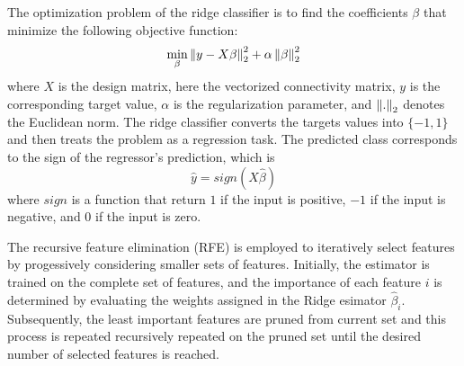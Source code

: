 The optimization problem of the ridge classifier is to find the coefficients $\beta$ that minimize the following objective function:
$$
\min_{\beta} \left\lVert y - X\beta\right\rVert_2^2 + \alpha \left\lVert\beta\right\rVert_2^2
$$
where $X$ is the design matrix, here the vectorized connectivity matrix, $y$ is the corresponding target value, $\alpha$ is the regularization parameter, and $\left\lVert.\right\rVert_2$ denotes the Euclidean norm. The ridge classifier converts the targets values into $\{-1, 1\}$ and then treats the problem as a regression task. The predicted class corresponds to the sign of the regressor's prediction, which is
$$
\hat{y} = sign(X\hat{\beta})
$$
where $sign$ is a function that return $1$ if the input is positive, $-1$ if the input is negative, and $0$ if the input is zero.

The recursive feature elimination (RFE) is employed to iteratively select features by progessively considering smaller sets of features. Initially, the estimator is trained on the complete set of features, and the importance of each feature $i$ is determined by evaluating the weights assigned in the Ridge esimator $\hat{\beta}_i$. Subsequently, the least important features are pruned from current set and this process is repeated recursively repeated on the pruned set until the desired number of selected features is reached.




